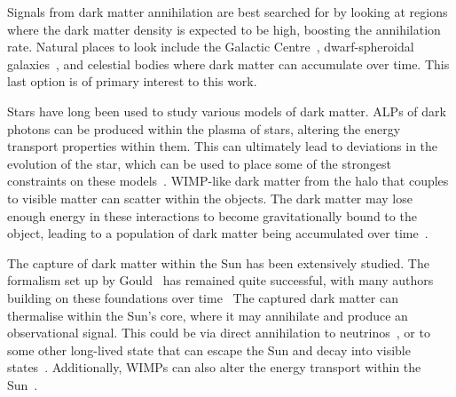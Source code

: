 Signals from dark matter annihilation are best searched for by looking at regions where the dark matter density is expected to be high, boosting the annihilation rate. 
Natural places to look include the Galactic Centre~\cite{Ipek:2014gua_sep_RenormalizableModelGalactic,Fermi-LAT:2017opo_may_FermiGalacticCenter}, dwarf-spheroidal galaxies~\cite{Bonnivard:2015xpq_oct_Darkmatterannihilation}, and celestial bodies where dark matter can accumulate over time.
This last option is of primary interest to this work.

Stars have long been used to study various models of dark matter. 
ALPs of dark photons can be produced within the plasma of stars, altering the energy transport properties within them.
This can ultimately lead to deviations in the evolution of the star, which can be used to place some of the strongest constraints on these models~\cite{An:2013yfc_oct_Newstellarconstraints, Dolan:2022kul_oct_Advancingglobularcluster,Dolan:2023cjs_jun_ConstrainingDarkPhotons, }.
WIMP-like dark matter from the halo that couples to visible matter can scatter within the objects. 
The dark matter may lose enough energy in these interactions to become gravitationally bound to the object, leading to a population of dark matter being accumulated over time~\cite{Press:1985ug_Capturesungalactic, Gould:1987ju_WeaklyInteractingMassive, Gould:1987ir_ResonantEnhancementsWIMP,Jungman:1995df_Supersymmetricdarkmatter,Busoni:2017mhe_oct_Evaporationscatteringmomentum}. 

The capture of dark matter within the Sun has been extensively studied. The formalism set up by Gould~\cite{Gould:1987ir_ResonantEnhancementsWIMP,Gould:1987ju_WeaklyInteractingMassive,Gould:1991va_Bigbangarcheology} has remained quite successful, with many authors building on these foundations over time~\cite{Busoni:2017mhe_oct_Evaporationscatteringmomentum,Garani:2017jcj_may_DarkmatterSun,Bramante:2017xlb_sep_Multiscatterstellarcapture}
The captured dark matter can thermalise within the Sun's core, where it may annihilate and produce an observational signal. 
This could be via direct annihilation to neutrinos~\cite{Super-Kamiokande:2011wjy_IndirectSearchWIMPs,Super-Kamiokande:2015xms_apr_Searchneutrinosannihilation,ANTARES:2016obx_may_SearchSecludedDark,ANTARES:2016xuh_aug_LimitsDarkMatter,IceCube:2016dgk_Searchannihilatingdark}, or to some other long-lived state that can escape the Sun and decay into visible states~\cite{Batell:2009zp_SolarGammaRays,Schuster:2009au_TerrestrialSolarLimits,Bell:2011sn_Enhancedneutrinosignals,Feng:2016ijc_jun_DarkSunshineDetecting,Leane:2017vag_jun_PowerfulSolarSignatures}.
Additionally, WIMPs can also alter the energy transport within the Sun~\cite{Gould:1989hm_THERMALCONDUCTIONMASSIVE,Gould:1989ez_CosmionEnergyTransfer,Vincent:2013lua_apr_Thermalconductiondark,Geytenbeek:2016nfg_mar_Effectelectromagneticdipole}.

